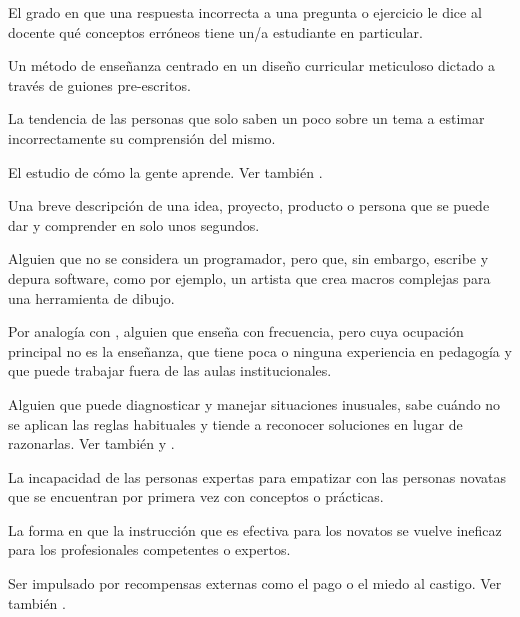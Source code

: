 \begin{description}
 El grado en que una respuesta incorrecta 
a una pregunta o ejercicio le dice al docente qué conceptos erróneos tiene un/a estudiante en particular.

 Un método de enseñanza centrado 
en un diseño curricular meticuloso dictado a través de guiones pre-escritos.

 La tendencia de las personas que solo saben 
un poco sobre un tema a estimar incorrectamente su comprensión del mismo.

 El estudio de cómo
la gente aprende. Ver también .


 Una breve descripción de una idea, 
proyecto, producto o persona que se puede dar y comprender en solo unos segundos.

 Alguien que no se considera 
un programador, pero que, sin embargo, escribe y depura software, como por ejemplo, un artista que 
crea macros complejas para una herramienta de dibujo.

 Por analogía con
,
alguien que enseña con frecuencia, pero cuya ocupación principal no es la enseñanza, 
que tiene poca o ninguna experiencia en pedagogía y que puede trabajar fuera de las aulas institucionales.

 Alguien que puede diagnosticar y manejar situaciones inusuales, 
sabe cuándo no se aplican las reglas habituales y tiende a reconocer soluciones en lugar de razonarlas. 
Ver también 
y .

 La incapacidad de las personas expertas 
para empatizar con las personas novatas que se encuentran por primera 
vez con conceptos o prácticas.

 La forma en que 
la instrucción que es efectiva para los novatos se vuelve ineficaz para 
los profesionales competentes o expertos.



 Ser impulsado por 
recompensas externas como el pago o el miedo al castigo. Ver
también .


\end{description}
